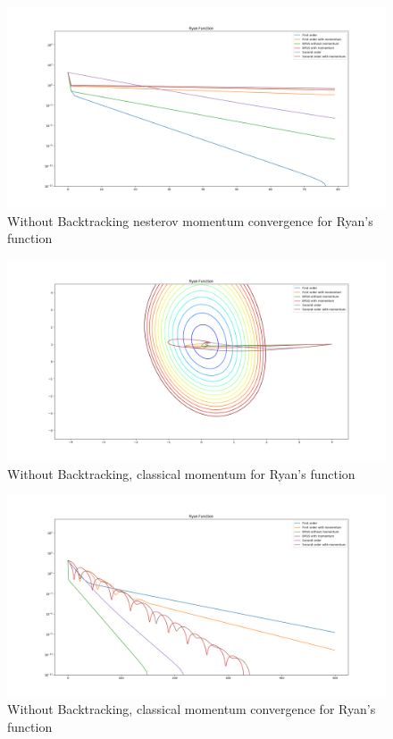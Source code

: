 \documentclass{article}
\begin{document}
\begin{figure}[H]
	\includegraphics[width=\linewidth]{../Images/ryannesterov1.png}
	\caption{Without Backtracking nesterov momentum convergence for Ryan's function}
	\label{fig:Without Backtracking nesterov momentum convergence for Ryan's function}
\end{figure}

\begin{figure}[H]
	\includegraphics[width=\linewidth]{../Images/ryanmomentum.png}
	\caption{Without Backtracking, classical momentum for Ryan's function}
	\label{fig:Without Backtracking, classical momentum for Ryan's function}
\end{figure}

\begin{figure}[H]
	\includegraphics[width=\linewidth]{../Images/ryanmomentum1.png}
	\caption{Without Backtracking, classical momentum convergence for Ryan's function}
	\label{fig:Without Backtracking, classical momentum convergence for Ryan's function}
\end{figure}
\end{document}
